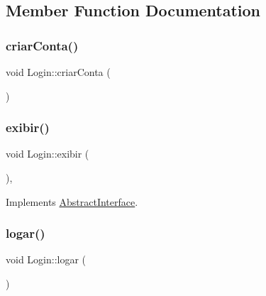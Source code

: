 \subsection{Member Function Documentation}
\mbox{\label{class_login_a31b7c1449884ccf603f80627a4bb7b78}} 
\subsubsection{\texorpdfstring{criar\+Conta()}{criarConta()}}
{\footnotesize\ttfamily void Login\+::criar\+Conta (\begin{DoxyParamCaption}{ }\end{DoxyParamCaption})\hspace{0.3cm}{\ttfamily [private]}}

\mbox{\label{class_login_a9396a20329d6ef8ef14bc84bb4f09f92}} 
\subsubsection{\texorpdfstring{exibir()}{exibir()}}
{\footnotesize\ttfamily void Login\+::exibir (\begin{DoxyParamCaption}{ }\end{DoxyParamCaption})\hspace{0.3cm}{\ttfamily [override]}, {\ttfamily [virtual]}}



Implements \hyperlink{class_abstract_interface_a1d5d2a15e6e640bd0190a835cb64e5ed}{Abstract\+Interface}.

\mbox{\label{class_login_aae4aa1e5c777d6f42f695edd6332da96}} 
\subsubsection{\texorpdfstring{logar()}{logar()}}
{\footnotesize\ttfamily void Login\+::logar (\begin{DoxyParamCaption}{ }\end{DoxyParamCaption})\hspace{0.3cm}{\ttfamily [private]}}

\mbox{\label{class_login_ad32313d37b2ca70d7f8057c04ec12b0e}} 
